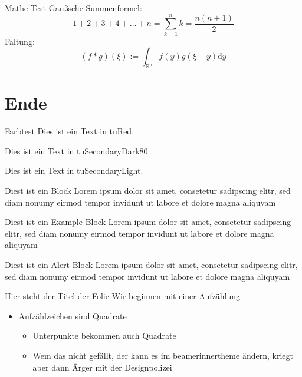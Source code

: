 \documentclass[11pt,cmyk,a4paper,colorscheme=green,TUBStitlepage=picture]{tubsartcl}
\begin{document}
\begin{frame}{Mathe-Test}
  Gaußsche Summenformel:
  \[1 + 2 + 3 + 4 + \ldots + n = \sum_{k=1}^n k = \frac{n(n+1)}{2}\]
  Faltung:
  \[(f*g)(\xi) := \int_{\mathbb{R}^n} f(y)g(\xi-y)\mathrm{d}y\]
\end{frame}

\section{Ende}

\begin{frame}{Farbtest}
  {\color{tuRed}
  Dies ist ein Text in tuRed.}

  {\color{tuSecondaryDark80}
  Dies ist ein Text in tuSecondaryDark80.}

  {\color{tuSecondaryLight}
  Dies ist ein Text in tuSecondaryLight.}

  \begin{block}{Diest ist ein Block}
    Lorem ipsum dolor sit amet, consetetur sadipscing elitr, sed diam
    nonumy eirmod tempor invidunt ut labore et dolore magna aliquyam
  \end{block}
  
  \begin{exampleblock}{Diest ist ein Example-Block}
    Lorem ipsum dolor sit amet, consetetur sadipscing elitr, sed diam
    nonumy eirmod tempor invidunt ut labore et dolore magna aliquyam
  \end{exampleblock}

  \begin{alertblock}{Diest ist ein Alert-Block}
    Lorem ipsum dolor sit amet, consetetur sadipscing elitr, sed diam
    nonumy eirmod tempor invidunt ut labore et dolore magna aliquyam
  \end{alertblock}
\end{frame}

\begin{frame}{Hier steht der Titel der Folie}
Wir beginnen mit einer Aufzählung
\begin{itemize}
\item Aufzählzeichen sind Quadrate
\begin{itemize}
\item Unterpunkte bekommen auch Quadrate
\item Wem das nicht gefällt, der kann es im beamerinnertheme ändern,
  kriegt aber dann Ärger mit der Designpolizei
\end{itemize}
\end{itemize}

\end{frame}


\end{document}
